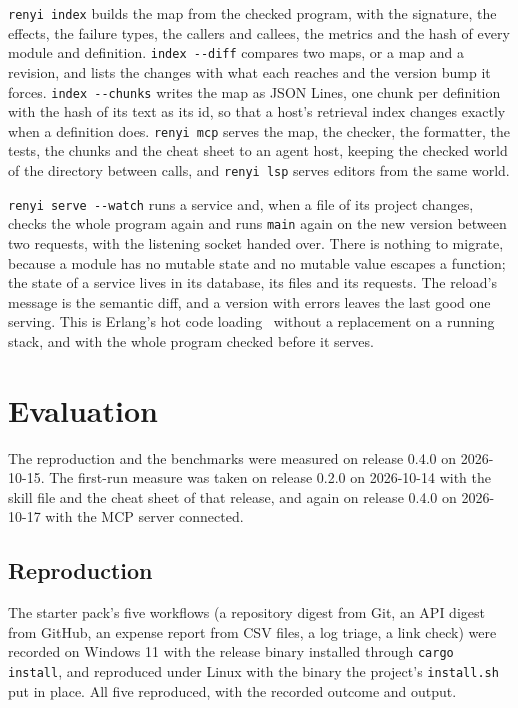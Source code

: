 \documentclass[11pt]{article}
\begin{document}
\texttt{renyi index} builds the map from the checked program, with the
signature, the effects, the failure types, the callers and callees, the
metrics and the hash of every module and definition. \texttt{index
-{}-diff} compares two maps, or a map and a revision, and lists the
changes with what each reaches and the version bump it forces.
\texttt{index -{}-chunks} writes the map as JSON Lines, one chunk per
definition with the hash of its text as its id, so that a host's
retrieval index changes exactly when a definition does. \texttt{renyi
mcp} serves the map, the checker, the formatter, the tests, the chunks
and the cheat sheet to an agent host, keeping the checked world of the
directory between calls, and \texttt{renyi lsp} serves editors from the
same world.

\texttt{renyi serve -{}-watch} runs a service and, when a file of its
project changes, checks the whole program again and runs \texttt{main}
again on the new version between two requests, with the listening
socket handed over. There is nothing to migrate, because a module has
no mutable state and no mutable value escapes a function; the state of
a service lives in its database, its files and its requests. The
reload's message is the semantic diff, and a version with errors leaves
the last good one serving. This is Erlang's hot code
loading~\citep{armstrong2003} without a replacement on a running stack,
and with the whole program checked before it serves.

\section{Evaluation}
\label{sec:evaluation}

The reproduction and the benchmarks were measured on release 0.4.0 on
2026-10-15. The first-run measure was taken on release 0.2.0 on
2026-10-14 with the skill file and the cheat sheet of that release,
and again on release 0.4.0 on 2026-10-17 with the MCP server
connected.

\subsection{Reproduction}

The starter pack's five workflows (a repository digest from Git, an API
digest from GitHub, an expense report from CSV files, a log triage, a
link check) were recorded on Windows 11 with the release binary
installed through \texttt{cargo install}, and reproduced under Linux
with the binary the project's \texttt{install.sh} put in place. All five
reproduced, with the recorded outcome and output.
\end{document}
